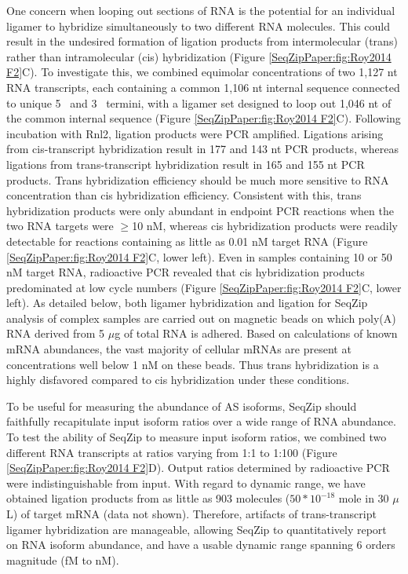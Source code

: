 		One concern when looping out sections of RNA is the potential for an individual ligamer to hybridize simultaneously to two different RNA molecules. This could result in the undesired formation of ligation products from intermolecular (trans) rather than intramolecular (cis) hybridization (Figure \ref{SeqZipPaper:fig:Roy2014 F2}C). To investigate this, we combined equimolar concentrations of two 1,127 nt RNA transcripts, each containing a common 1,106 nt internal sequence connected to unique 5\textprime~ and 3\textprime~ termini, with a ligamer set designed to loop out 1,046 nt of the common internal sequence (Figure \ref{SeqZipPaper:fig:Roy2014 F2}C). Following incubation with Rnl2, ligation products were PCR amplified. Ligations arising from cis-transcript hybridization result in 177 and 143 nt PCR products, whereas ligations from trans-transcript hybridization result in 165 and 155 nt PCR products. Trans hybridization efficiency should be much more sensitive to RNA concentration than cis hybridization efficiency. Consistent with this, trans hybridization products were only abundant in endpoint PCR reactions when the two RNA targets were $\ge$10 nM, whereas cis hybridization products were readily detectable for reactions containing as little as 0.01 nM target RNA (Figure \ref{SeqZipPaper:fig:Roy2014 F2}C, lower left). Even in samples containing 10 or 50 nM target RNA, radioactive PCR revealed that cis hybridization products predominated at low cycle numbers (Figure \ref{SeqZipPaper:fig:Roy2014 F2}C, lower left). As detailed below, both ligamer hybridization and ligation for SeqZip analysis of complex samples are carried out on magnetic beads on which poly(A) RNA derived from 5 $\mu$g of total RNA is adhered. Based on calculations of known mRNA abundances, the vast majority of cellular mRNAs are present at concentrations well below 1 nM on these beads. Thus trans hybridization is a highly disfavored compared to cis hybridization under these conditions.

		To be useful for measuring the abundance of AS isoforms, SeqZip should faithfully recapitulate input isoform ratios over a wide range of RNA abundance. To test the ability of SeqZip to measure input isoform ratios, we combined two different RNA transcripts at ratios varying from 1:1 to 1:100 (Figure \ref{SeqZipPaper:fig:Roy2014 F2}D). Output ratios determined by radioactive PCR were indistinguishable from input. With regard to dynamic range, we have obtained ligation products from as little as 903 molecules ($50 * 10^{-18}$ mole in 30 $\mu$L) of target mRNA (data not shown). Therefore, artifacts of trans-transcript ligamer hybridization are manageable, allowing SeqZip to quantitatively report on RNA isoform abundance, and have a usable dynamic range spanning 6 orders magnitude (fM to nM).

